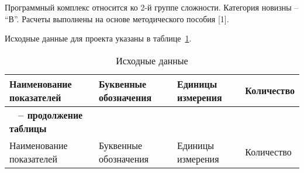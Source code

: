 Программный комплекс относится ко 2-й группе сложности. Категория новизны – “В”. Расчеты выполнены на основе методического пособия [1].

Исходные данные для проекта указаны в таблице~\ref{table:econ:initial_data}.

\clearpage

\begin{longtable}{| >{\raggedright}m{}
              | >{\centering}m{}
              | >{\centering}m{}
              | >{\centering\arraybackslash}m{}|}
\caption{Исходные данные}
\label{table:econ:initial_data} \\

\hline
Наименование показателей & Буквенные обозначения & Единицы измерения & Количество \\
\endfirsthead

\multicolumn{3}{c}%
{{\bfseries \tablename\ \thetable{} -- продолжение таблицы}} \\
\hline
Наименование показателей & Буквенные обозначения & Единицы измерения & Количество \\
\endhead


\end{longtable}
